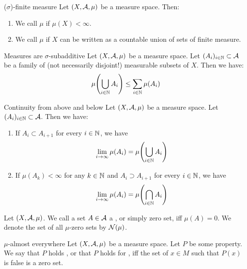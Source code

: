 \begin{importantdefinition}{($\sigma$)-finite measure}{}
	Let $(X, \mathcal{A}, \mu)$ be a measure space. Then:
	\begin{enumerate}
		\item We call $\mu$  if $\mu(X) < \infty$.
		\item We call $\mu$  if $X$ can be written as a countable union of sets of finite measure.
	\end{enumerate}
\end{importantdefinition}
\begin{importanttheorem}{Measures are $\sigma$-subadditive}{}
	Let $(X, \mathcal{A}, \mu)$ be a measure space. Let $(A_i)_{i \in \mathbb{N}} \subset \mathcal{A}$ be a family of (not necessarily disjoint!) measurable subsets of $X$. Then we have:
	\begin{align*}
		\mu\qty(\bigcup_{i \in \mathbb{N}} A_i) \leq \sum_{i \in \mathbb{N}} \mu(A_i)
	\end{align*}
\end{importanttheorem}
\begin{importanttheorem}{Continuity from above and below}{}
	Let $(X, \mathcal{A}, \mu)$ be a measure space. Let $(A_i)_{i \in \mathbb{N}} \subset \mathcal{A}$. Then we have:
	\begin{enumerate}
		\item {} If $A_i \subset A_{i+1}$ for every $i \in \mathbb{N}$, we have
		\begin{align*}
			\lim_{i \to \infty} \mu(A_i) = \mu\qty(\bigcup_{i \in \mathbb{N}} A_i)
		\end{align*}
		\item {} If $\mu(A_k) < \infty$ for any $k \in \mathbb{N}$ and $A_i \supset A_{i+1}$ for every $i \in \mathbb{N}$, we have
		\begin{align*}
			\lim_{i \to \infty} \mu(A_i) = \mu\qty(\bigcap_{i \in \mathbb{N}} A_i)
		\end{align*}
	\end{enumerate}
\end{importanttheorem}
\begin{definition}
	Let $(X, \mathcal{A}, \mu)$. We call a set $A \in \mathcal{A}$ a , or simply zero set, iff $\mu(A) = 0$. We denote the set of all $\mu$-zero sets by $\mathcal{N}(\mu)$.
\end{definition}
\begin{importantdefinition}{$\mu$-almost everywhere}{}
	Let $(X, \mathcal{A}, \mu)$ be a measure space. Let $P$ be some property. We say that $P$ holds , or that $P$ holds for , iff the set of $x \in M$ such that $P(x)$ is false is a zero set.
\end{importantdefinition}
